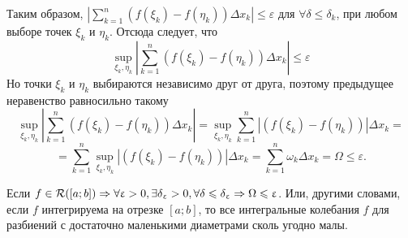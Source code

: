 Таким образом, $|\sum\limits_{k=1}^{n}(f(\xi_k) - f(\eta_k))\Delta x_k| \le \varepsilon$  для $\forall \delta \le \delta_k$, при любом выборе точек $\xi_k$ и $\eta_k$. Отсюда следует, что
$$\sup_{\xi_k, \eta_k} |\sum_{k=1}^{n}(f(\xi_k) - f(\eta_k))\Delta x_k| \le \varepsilon$$
Но точки $\xi_k$ и $\eta_k$ выбираются независимо друг от друга, поэтому предыдущее неравенство равносильно такому 
$$\sup_{\xi_k, \eta_k} |\sum_{k=1}^{n}(f(\xi_k) - f(\eta_k))\Delta x_k| = \sup_{\xi_k, \eta_k} \sum_{k=1}^{n}|(f(\xi_k) - f(\eta_k))|\Delta x_k =$$ $$ = \sum_{k=1}^{n}\sup_{\xi_k, \eta_k}|(f(\xi_k) - f(\eta_k))|\Delta x_k = \sum_{k=1}^{n}\omega_k \Delta x_k = \Omega \le \varepsilon.$$
\begin{theorem}
	Если $f\in\mathcal{R}([a; b]) \Rightarrow \forall \upvarepsilon > 0, \exists \delta_\upvarepsilon > 0, \forall \delta \leqslant \delta_\upvarepsilon \Rightarrow \Omega \leqslant \upvarepsilon$. Или, другими словами, если $f$ интегрируема на отрезке $[a;b]$, то все интегральные колебания $f$ для разбиений с достаточно маленькими диаметрами сколь угодно малы.
\end{theorem}
